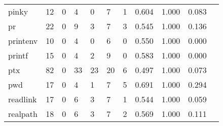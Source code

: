 \begin{longtable}{lp{1.10cm}p{1.10cm}p{1.10cm}p{1.10cm}p{1.10cm}p{1.10cm}p{1.10cm}p{1.10cm}p{1.10cm}p{1.10cm}}
pinky     &                     12 &                                  0 &                                 4 &                                0 &                                 7 &                               1 &                          0.604 &                                 1.000 &                               0.083 \\
pr        &                     22 &                                  0 &                                 9 &                                3 &                                 7 &                               3 &                          0.545 &                                 1.000 &                               0.136 \\
printenv  &                     10 &                                  0 &                                 4 &                                0 &                                 6 &                               0 &                          0.550 &                                 1.000 &                               0.000 \\
printf    &                     15 &                                  0 &                                 4 &                                2 &                                 9 &                               0 &                          0.583 &                                 1.000 &                               0.000 \\
ptx       &                     82 &                                  0 &                                33 &                               23 &                                20 &                               6 &                          0.497 &                                 1.000 &                               0.073 \\
pwd       &                     17 &                                  0 &                                 4 &                                1 &                                 7 &                               5 &                          0.691 &                                 1.000 &                               0.294 \\
readlink  &                     17 &                                  0 &                                 6 &                                3 &                                 7 &                               1 &                          0.544 &                                 1.000 &                               0.059 \\
realpath  &                     18 &                                  0 &                                 6 &                                3 &                                 7 &                               2 &                          0.569 &                                 1.000 &                               0.111 \\

\end{longtable}
